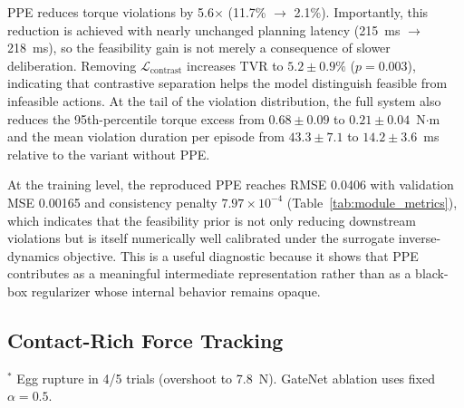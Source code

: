 \documentclass[12pt]{article}
\begin{document}
PPE reduces torque violations by 5.6$\times$ (11.7\% $\rightarrow$ 2.1\%). Importantly, this reduction is achieved with nearly unchanged planning latency (215~ms $\rightarrow$ 218~ms), so the feasibility gain is not merely a consequence of slower deliberation. Removing $\mathcal{L}_{\mathrm{contrast}}$ increases TVR to $5.2\pm0.9\%$ ($p=0.003$), indicating that contrastive separation helps the model distinguish feasible from infeasible actions. At the tail of the violation distribution, the full system also reduces the 95th-percentile torque excess from $0.68\pm0.09$ to $0.21\pm0.04$~N$\cdot$m and the mean violation duration per episode from $43.3\pm7.1$ to $14.2\pm3.6$~ms relative to the variant without PPE.

At the training level, the reproduced PPE reaches RMSE 0.0406 with validation MSE 0.00165 and consistency penalty $7.97\times10^{-4}$ (Table~\ref{tab:module_metrics}), which indicates that the feasibility prior is not only reducing downstream violations but is itself numerically well calibrated under the surrogate inverse-dynamics objective. This is a useful diagnostic because it shows that PPE contributes as a meaningful intermediate representation rather than as a black-box regularizer whose internal behavior remains opaque.

\subsection{Contact-Rich Force Tracking}

\begin{table}[htbp]
\centering
\caption{Force tracking RMSE across stiffness regimes (N, mean $\pm$ SD, target $=5$~N).}
\label{tab:force}
\small\setlength{\tabcolsep}{3pt}
\par\smallskip\footnotesize
$^{*}$ Egg rupture in 4/5 trials (overshoot to 7.8~N). GateNet ablation uses fixed $\alpha=0.5$.
\end{table}
\end{document}
